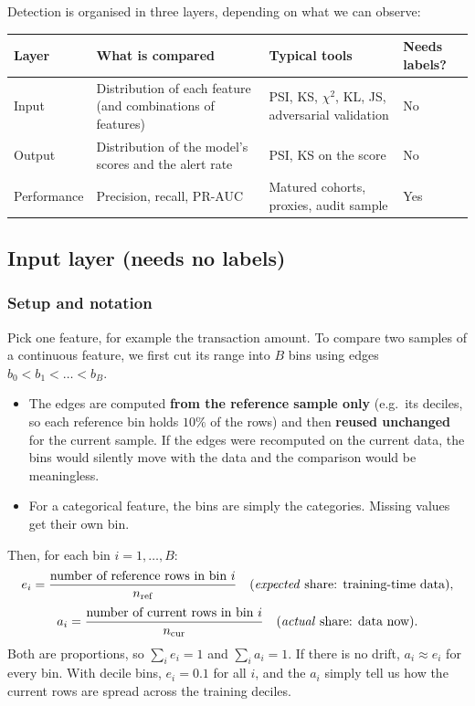 \documentclass[11pt]{article}
\begin{document}
Detection is organised in three layers, depending on what we can observe:

\begin{center}
\begin{tabular}{|p{2.6cm}|p{5.2cm}|p{3.4cm}|p{2.6cm}|}
\hline
\textbf{Layer} & \textbf{What is compared} & \textbf{Typical tools} & \textbf{Needs labels?} \\
\hline
Input & Distribution of each feature (and combinations of features) & PSI, KS, \(\chi^2\), KL, JS, adversarial validation & No \\
\hline
Output & Distribution of the model's scores and the alert rate & PSI, KS on the score & No \\
\hline
Performance & Precision, recall, PR-AUC & Matured cohorts, proxies, audit sample & Yes \\
\hline
\end{tabular}
\end{center}

\subsection{Input layer (needs no labels)}

\subsubsection{Setup and notation}

Pick one feature, for example the transaction amount. To compare two samples of a continuous feature, we first cut its range into \(B\) bins using edges \(b_0<b_1<\dots<b_B\).
\begin{itemize}
    \item The edges are computed \textbf{from the reference sample only} (e.g.\ its deciles, so each reference bin holds \(10\%\) of the rows) and then \textbf{reused unchanged} for the current sample. If the edges were recomputed on the current data, the bins would silently move with the data and the comparison would be meaningless.
    \item For a categorical feature, the bins are simply the categories. Missing values get their own bin.
\end{itemize}

Then, for each bin \(i=1,\dots,B\):
\[
e_i=\frac{\text{number of reference rows in bin } i}{n_{\text{ref}}}
\quad\text{(\emph{expected} share: training-time data)},
\]
\[
a_i=\frac{\text{number of current rows in bin } i}{n_{\text{cur}}}
\quad\text{(\emph{actual} share: data now)}.
\]
Both are proportions, so \(\sum_i e_i=1\) and \(\sum_i a_i=1\). If there is no drift, \(a_i\approx e_i\) for every bin. With decile bins, \(e_i=0.1\) for all \(i\), and the \(a_i\) simply tell us how the current rows are spread across the training deciles.
\end{document}
